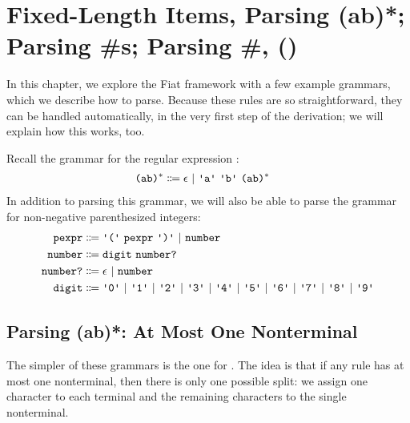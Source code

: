 \chapter{Fixed-Length Items, Parsing (ab)*; Parsing \#s; Parsing \#, ()} \label{ch:fixed-length}
  In this chapter, we explore the Fiat framework with a few example grammars, which we describe how to parse.  Because these rules are so straightforward, they can be handled automatically, in the very first step of the derivation; we will explain how this works, too.

  Recall the grammar for the regular expression :
  \begin{align*}
    \nt{(ab)$^*$} & \Coloneqq \nt{$\epsilon$}~|~\terminal{a}~\terminal{b}~\nt{(ab)$^*$}
  \end{align*}
  In addition to parsing this grammar, we will also be able to parse the grammar for non-negative parenthesized integers:
  \begin{align*}
    \nt{pexpr} & \Coloneqq \terminal{(}~\nt{pexpr}~\terminal{)}~|~\nt{number} \\
    \nt{number} & \Coloneqq \nt{digit}~\nt{number?} \\
    \nt{number?} & \Coloneqq \epsilon~|~\nt{number} \\
    \nt{digit} & \Coloneqq \terminal{0}~|~\terminal{1}~|~\terminal{2}~|~\terminal{3}~|~\terminal{4}~|~\terminal{5}~|~\terminal{6}~|~\terminal{7}~|~\terminal{8}~|~\terminal{9}
  \end{align*}

  \section{Parsing (ab)*: At Most One Nonterminal}
    The simpler of these grammars is the one for .  The idea is that if any rule has at most one nonterminal, then there is only one possible split: we assign one character to each terminal and the remaining characters to the single nonterminal.


